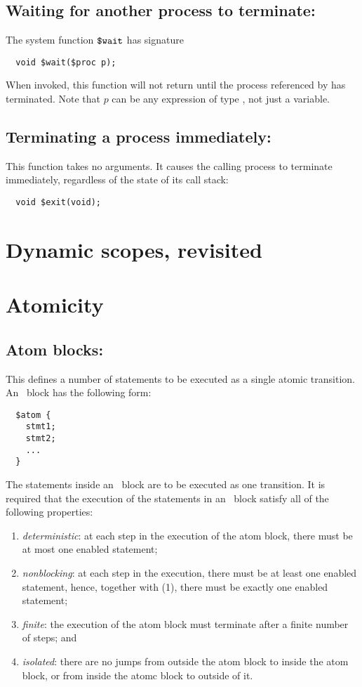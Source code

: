 \subsection{Waiting for another process to terminate: \cwait}

The system function $\mbox{\texttt{\${}wait}}$ has signature
\begin{verbatim}
  void $wait($proc p);
\end{verbatim}
When invoked, this function will not return until the process
referenced by  has terminated. Note that $p$ can be any
expression of type \cproc{}, not just a variable.

\subsection{Terminating a process immediately: \cexit}

This function takes no arguments.  It causes the
calling process to terminate immediately, regardless of the state of
its call stack:
\begin{verbatim}
  void $exit(void);
\end{verbatim}

\section{Dynamic scopes, revisited}

\section{Atomicity}

\subsection{Atom blocks: \catom} This defines a number of statements to be executed
as a single atomic transition.  An \catom~block has the following
form:
\begin{verbatim}
  $atom {
    stmt1;
    stmt2;
    ...
  }
\end{verbatim}

The statements inside an \catom\ block are to be executed as one
transition. It is required that the execution of the statements in an
\catom\ block satisfy all of the following properties:
\begin{enumerate}
\item \emph{deterministic}: at each step in the execution of the atom
  block, there must be at most one enabled statement;
\item \emph{nonblocking}: at each step in the execution, there must be
  at least one enabled statement, hence, together with (1), there must
  be exactly one enabled statement;
\item \emph{finite}: the execution of the atom block must terminate
  after a finite number of steps; and
\item \emph{isolated}: there are no jumps from outside the atom block
  to inside the atom block, or from inside the atomc block to outside
  of it.
\end{enumerate}

